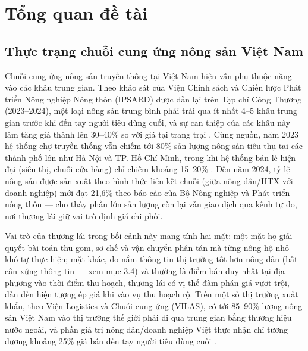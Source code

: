 \section{Tổng quan đề tài}

\subsection{Thực trạng chuỗi cung ứng nông sản Việt Nam}

Chuỗi cung ứng nông sản truyền thống tại Việt Nam hiện vẫn phụ thuộc nặng vào các khâu trung gian. Theo khảo sát của Viện Chính sách và Chiến lược Phát triển Nông nghiệp Nông thôn (IPSARD) được dẫn lại trên Tạp chí Công Thương (2023--2024), một loại nông sản trung bình phải trải qua ít nhất 4--5 khâu trung gian trước khi đến tay người tiêu dùng cuối, và sự can thiệp của các khâu này làm tăng giá thành lên 30--40\% so với giá tại trang trại \cite{tapchicongthuong_ipsard_2023_2024}. Cùng nguồn, năm 2023 hệ thống chợ truyền thống vẫn chiếm tới 80\% sản lượng nông sản tiêu thụ tại các thành phố lớn như Hà Nội và TP. Hồ Chí Minh, trong khi hệ thống bán lẻ hiện đại (siêu thị, chuỗi cửa hàng) chỉ chiếm khoảng 15--20\% \cite{tapchicongthuong_ipsard_2023_2024}. Đến năm 2024, tỷ lệ nông sản được sản xuất theo hình thức liên kết chuỗi (giữa nông dân/HTX với doanh nghiệp) mới đạt 21,6\% theo báo cáo của Bộ Nông nghiệp và Phát triển nông thôn \cite{tapchicongthuong_ipsard_2023_2024} --- cho thấy phần lớn sản lượng còn lại vẫn giao dịch qua kênh tự do, nơi thương lái giữ vai trò định giá chi phối.

Vai trò của thương lái trong bối cảnh này mang tính hai mặt: một mặt họ giải quyết bài toán thu gom, sơ chế và vận chuyển phân tán mà từng nông hộ nhỏ khó tự thực hiện; mặt khác, do nắm thông tin thị trường tốt hơn nông dân (bất cân xứng thông tin --- xem mục 3.4) và thường là điểm bán duy nhất tại địa phương vào thời điểm thu hoạch, thương lái có vị thế đàm phán giá vượt trội, dẫn đến hiện tượng ép giá khi vào vụ thu hoạch rộ. Trên một số thị trường xuất khẩu, theo Viện Logistics và Chuỗi cung ứng (VILAS), có tới 85--90\% lượng nông sản Việt Nam vào thị trường thế giới phải đi qua trung gian bằng thương hiệu nước ngoài, và phần giá trị nông dân/doanh nghiệp Việt thực nhận chỉ tương đương khoảng 25\% giá bán đến tay người tiêu dùng cuối \cite{vilas_logistics}.

